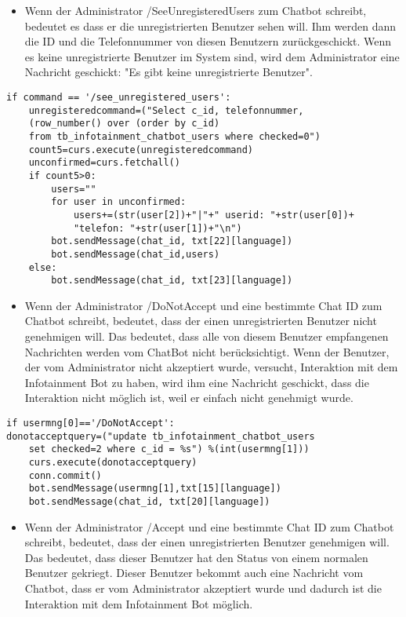 \begin{itemize}
	\item Wenn der Administrator /SeeUnregisteredUsers zum Chatbot schreibt, bedeutet es dass er die unregistrierten Benutzer sehen will. Ihm werden dann die ID und die Telefonnummer von diesen Benutzern zurückgeschickt. Wenn es keine unregistrierte Benutzer im System sind, wird dem Administrator eine Nachricht geschickt: "Es gibt keine unregistrierte Benutzer". 
\end{itemize}
\begin{lstlisting}[frame=single]
if command == '/see_unregistered_users':
	unregisteredcommand=("Select c_id, telefonnummer,
	(row_number() over (order by c_id) 
	from tb_infotainment_chatbot_users where checked=0")
	count5=curs.execute(unregisteredcommand)
	unconfirmed=curs.fetchall()
	if count5>0:
		users=""
		for user in unconfirmed:
			users+=(str(user[2])+"|"+" userid: "+str(user[0])+
			"telefon: "+str(user[1])+"\n")
		bot.sendMessage(chat_id, txt[22][language])
		bot.sendMessage(chat_id,users)
	else:
		bot.sendMessage(chat_id, txt[23][language])	
\end{lstlisting}
\begin{itemize}
	\item Wenn der Administrator /DoNotAccept und eine bestimmte Chat ID zum Chatbot schreibt, bedeutet, dass der einen unregistrierten Benutzer nicht genehmigen will. Das bedeutet, dass alle von diesem Benutzer empfangenen Nachrichten werden vom ChatBot nicht berücksichtigt. Wenn der Benutzer, der vom Administrator nicht akzeptiert wurde, versucht, Interaktion mit dem Infotainment Bot zu haben, wird ihm eine Nachricht geschickt, dass die Interaktion nicht m\"oglich ist, weil er einfach nicht genehmigt wurde.
\end{itemize}	
\begin{lstlisting}[frame=single]
if usermng[0]=='/DoNotAccept':
donotacceptquery=("update tb_infotainment_chatbot_users 
	set checked=2 where c_id = %s") %(int(usermng[1]))
	curs.execute(donotacceptquery)
	conn.commit()
	bot.sendMessage(usermng[1],txt[15][language])
	bot.sendMessage(chat_id, txt[20][language])
\end{lstlisting}
\begin{itemize}
	\item Wenn der Administrator /Accept und eine bestimmte Chat ID zum Chatbot schreibt, bedeutet, dass der einen unregistrierten Benutzer genehmigen will. Das bedeutet, dass dieser Benutzer hat den Status von einem normalen Benutzer gekriegt. Dieser Benutzer bekommt auch eine Nachricht vom Chatbot, dass er vom Administrator akzeptiert wurde und dadurch ist die Interaktion mit dem Infotainment Bot m\"oglich.
\end{itemize}	
